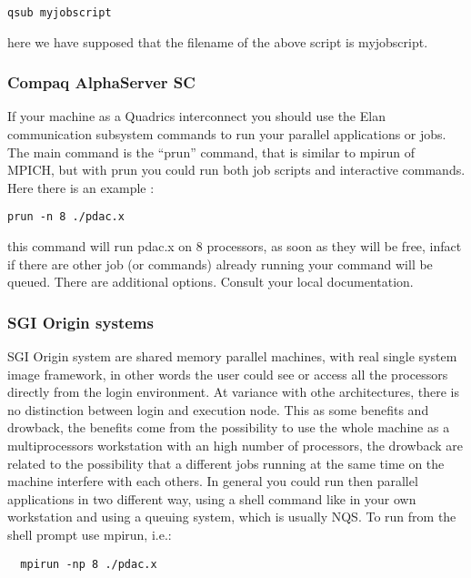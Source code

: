 \begin{verbatim}
qsub myjobscript
\end{verbatim}

here we have supposed that the filename of the above script is
myjobscript.

\subsubsection{Compaq AlphaServer SC}

If your machine as a Quadrics interconnect you should use the 
Elan communication subsystem commands to run your parallel applications
or jobs. The main command is the ``prun'' command, that is similar
to mpirun of MPICH, but with prun you could run both job scripts
and interactive commands. Here there is an example :

\begin{verbatim}
prun -n 8 ./pdac.x
\end{verbatim}

this command will run pdac.x on 8 processors, as soon as they will
be free, infact if there are other job (or commands) already running
your command will be queued.
There are additional options.  Consult your local documentation.

\subsubsection{SGI Origin systems}

SGI Origin system are shared memory parallel machines, with
real single system image framework, in other words the user
could see or access all the processors directly from the 
login environment. At variance with othe architectures,
there is no distinction between login and execution node.
This as some benefits and drowback, the benefits come from
the possibility to use the whole machine as a multiprocessors
workstation with an high number of processors, the drowback
are related to the possibility that a different jobs running
at the same time on the machine interfere with each others.
In general you could run then parallel applications 
in two different way, using a shell command like in your own
workstation and using a queuing system, which is usually NQS.
To run from the shell prompt use mpirun, i.e.: 

\begin{verbatim}
  mpirun -np 8 ./pdac.x
\end{verbatim}


